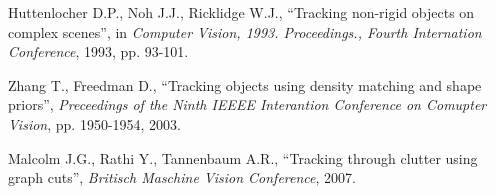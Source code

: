 \begin{thebibliography}{SMAT}
 Huttenlocher D.P., Noh J.J., Ricklidge W.J., ``Tracking non-rigid objects on complex scenes'', in \textit{Computer Vision, 1993. Proceedings., Fourth Internation Conference}, 1993, pp. 93-101.

 Zhang T., Freedman D., ``Tracking objects using density matching and shape priors'', \textit{Preceedings of the Ninth IEEEE Interantion Conference on Comupter Vision}, pp. 1950-1954, 2003.

 Malcolm J.G., Rathi Y., Tannenbaum A.R., ``Tracking through clutter using graph cuts'', \textit{Britisch Maschine Vision Conference}, 2007.

\end{thebibliography}